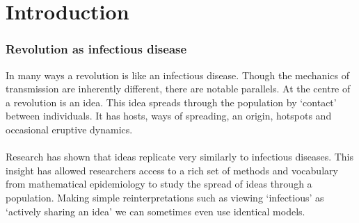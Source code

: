 	\chapter{Introduction}
\subsection{Revolution as infectious disease}
In many ways a revolution is like an infectious disease. Though the mechanics of transmission are inherently different, there are notable parallels. At the centre of a revolution is an idea. This idea spreads through the population by `contact' between individuals. It has hosts, ways of spreading, an origin, hotspots and occasional eruptive dynamics.\\
\\
Research has shown that ideas replicate very similarly to infectious diseases\cite{meme-epidemic}\cite{the-power-of-a-good-idea}. This insight has allowed researchers access to a rich set of methods and vocabulary from mathematical epidemiology to study the spread of ideas through a population. Making simple reinterpretations such as viewing `infectious' as `actively sharing an idea' we can sometimes even use identical models\cite{thomas-house}.\\
\\
